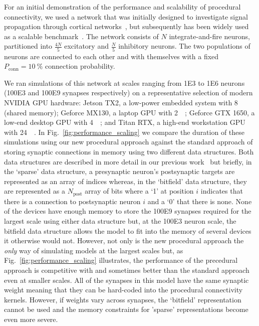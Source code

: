 \documentclass[9pt,twocolumn,twoside,lineno]{pnas-new}
\begin{document}
For an initial demonstration of the performance and scalability of procedural connectivity, we used a network that was initially designed to investigate signal propagation through cortical networks~\citep{Vogels2005}, but subsequently has been widely used as a scalable benchmark~\citep{Brette2007}.
The network consists of $N$ integrate-and-fire neurons, partitioned into $\frac{4N}{5}$ excitatory and $\frac{N}{5}$ inhibitory neurons.
The two populations of neurons are connected to each other and with themselves with a fixed $P_{\text{conn}}=\SI{10}{\percent}$ connection probability.

We ran simulations of this network at scales ranging from \num{1E3} to \num{1E6} neurons (\num{100E3} and \num{100E9} synapses respectively) on a representative selection of modern NVIDIA GPU hardware:
Jetson TX2, a low-power embedded system with \SI{8}{\giga\byte} (shared memory);
Geforce MX130, a laptop GPU with \SI{2}{\giga\byte};
Geforce GTX 1650, a low-end desktop GPU with \SI{4}{\giga\byte};
and Titan RTX, a high-end workstation GPU with \SI{24}{\giga\byte}.
In Fig.~\ref{fig:performance_scaling} we compare the duration of these simulations using our new procedural approach against the standard approach of storing synaptic connections in memory using two different data structures.
Both data structures are described in more detail in our previous work~\citep{Knight2018} but briefly, in the `sparse' data structure, a presynaptic neuron's postsynaptic targets are represented as an array of indices whereas, in the `bitfield' data structure, they are represented as a $N_{\text{post}}$ array of bits where a `1' at position $i$ indicates that there is a connection to postsynaptic neuron $i$ and a `0' that there is none.
None of the devices have enough memory to store the \num{100E9} synapses required for the largest scale using either data structure but, at the \num{100E3} neuron scale, the bitfield data structure allows the model to fit into the memory of several devices it otherwise would not.
However, not only is the new procedural approach the \emph{only} way of simulating models at the largest scales but, as Fig.~\ref{fig:performance_scaling} illustrates, the performance of the precedural approach is competitive with and sometimes better than the standard approach even at smaller scales.
All of the synapses in this model have the same synaptic weight meaning that they can be hard-coded into the procedural connectivity kernels.
However, if weights vary across synapses, the `bitfield' representation cannot be used and the memory constraints for 'sparse' representations become even more severe.
%
\end{document}
